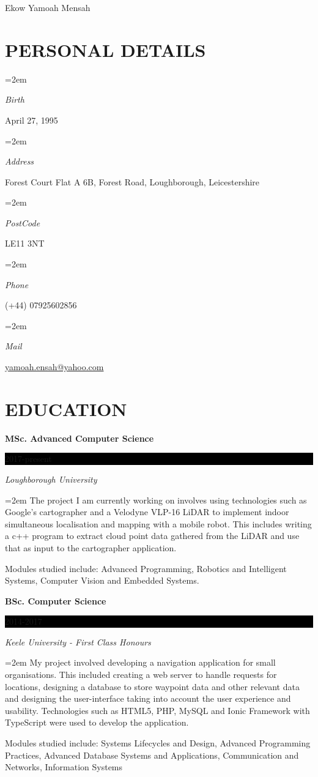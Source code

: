 \documentclass[paper=a4,fontsize=11pt]{scrartcl} %
\newlength{\spacebox}
\newcommand{\sepspace}{\vspace*{1em}}       %
\newcommand{\MyName}[1]{ %
        \Huge \usefont{OT1}{phv}{b}{n} \hfill #1
        \par \normalsize \normalfont}
\newcommand{\MySlogan}[1]{ %
        \large \usefont{OT1}{phv}{m}{n}\hfill \textit{#1}
        \par \normalsize \normalfont}
\newcommand{\NewPart}[1]{\section*{\uppercase{#1}}}
\newcommand{\PersonalEntry}[2]{
        \noindent\hangindent=2em\hangafter=0 %
        \parbox{\spacebox}{        %
        \textit{#1}}               %
        \hspace{1.5em} #2 \par}    %
\newcommand{\EducationEntry}[4]{
        \noindent \textbf{#1} \hfill      %
        \colorbox{Black}{%
            \parbox{6em}{%
            \hfill\color{White}#2}} \par  %
        \noindent \textit{#3} \par        %
        \noindent\hangindent=2em\hangafter=0 \small #4 %
        \normalsize \par}
\begin{document}

\MyName{Ekow Yamoah Mensah}
\MySlogan{}

\sepspace

\NewPart{Personal details}{}

\PersonalEntry{Birth}{April 27, 1995}
\PersonalEntry{Address}{Forest Court Flat A 6B, Forest Road, Loughborough, Leicestershire}
\PersonalEntry{PostCode}{LE11 3NT}
\PersonalEntry{Phone}{(+44) 07925602856}
\PersonalEntry{Mail}{\url{yamoah.ensah@yahoo.com}}

\NewPart{Education}{}

\EducationEntry{MSc. Advanced Computer Science}{2017-present}{Loughborough University}{ The project I am currently working on involves using technologies such as Google's cartographer and a Velodyne VLP-16 LiDAR to implement indoor simultaneous localisation and mapping with a mobile robot. This includes writing a c++ program to extract cloud point data gathered from the LiDAR and use that as input to the cartographer application.\\}{\noindent Modules studied include: Advanced Programming, Robotics and Intelligent Systems, Computer Vision and Embedded Systems.}


\sepspace

\EducationEntry{BSc. Computer Science}{2014-2017}{Keele University - First Class Honours}{My project involved developing a navigation application for small organisations. This included creating a web server to handle requests for locations, designing a database to store waypoint data and other relevant data and designing the user-interface taking into account the user experience and usability. Technologies such as HTML5, PHP, MySQL and Ionic Framework with TypeScript were used to develop the application.\\}{\noindent Modules studied include: Systems Lifecycles and Design, Advanced Programming Practices, Advanced Database Systems and Applications, Communication and Networks, Information Systems}

\sepspace
\end{document}
